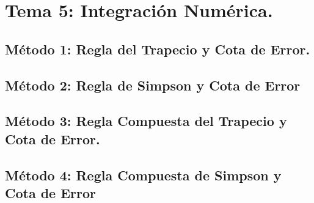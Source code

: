 \documentclass[10pt]{article}
\begin{document}
\newpage

\section{Tema 5: Integración Numérica.}

\subsection{Método 1: Regla del Trapecio y Cota de Error.}


\newpage

\subsection{Método 2: Regla de Simpson y Cota de Error}
\UseRawInputEncoding


\newpage

\subsection{Método 3: Regla Compuesta del Trapecio y Cota de Error.}


\newpage

\subsection{Método 4: Regla Compuesta de Simpson y Cota de Error}
\UseRawInputEncoding

\end{document}
